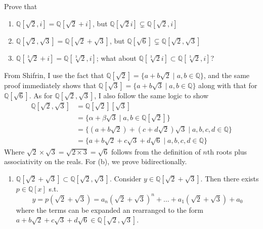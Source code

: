   \begin{exercise}[Shifrin 3.2.2.b/c]
    Prove that
    \begin{enumerate}
      \item $\mathbb{Q}[\sqrt{2}, i] = \mathbb{Q}[\sqrt{2} + i]$, but $\mathbb{Q}[\sqrt{2}i] \subsetneq \mathbb{Q}[\sqrt{2}, i]$
      \item $\mathbb{Q}[\sqrt{2}, \sqrt{3}] = \mathbb{Q}[\sqrt{2} + \sqrt{3}]$, but $\mathbb{Q}[\sqrt{6}] \subsetneq \mathbb{Q}[\sqrt{2}, \sqrt{3}]$
      \item $\mathbb{Q}[\sqrt[3]{2} + i] = \mathbb{Q}[\sqrt[3]{2}, i]$; what about $\mathbb{Q}[\sqrt[3]{2}i] \subset \mathbb{Q}[\sqrt[3]{2}, i]$?
    \end{enumerate}
  \end{exercise}
  \begin{solution}
    From Shifrin, I use the fact that $\mathbb{Q}[\sqrt{2}] = \{ a + b \sqrt{2} \mid a, b \in \mathbb{Q}\}$, and the same proof immediately shows that $\mathbb{Q}[\sqrt{3}] = \{ a + b \sqrt{3} \mid a, b \in \mathbb{Q}\}$ along with that for $\mathbb{Q}[\sqrt{6}]$. As for $\mathbb{Q}[\sqrt{2}, \sqrt{3}]$, I also follow the same logic to show 
    \begin{align}
      \mathbb{Q}[\sqrt{2}, \sqrt{3}] & = \mathbb{Q}[\sqrt{2}][\sqrt{3}] \\
                                     & = \{\alpha + \beta \sqrt{3} \mid a, b \in \mathbb{Q}[\sqrt{2}]\} \\
                                     & = \{ (a + b\sqrt{2}) + (c + d \sqrt{2}) \sqrt{3} \mid a, b, c, d \in \mathbb{Q} \} \\
                                     & = \{ a + b\sqrt{2} + c \sqrt{3} + d \sqrt{6} \mid a, b, c, d \in \mathbb{Q} \} 
    \end{align}
    Where $\sqrt{2} \times \sqrt{3} = \sqrt{2 \times 3} = \sqrt{6}$ follows from the definition of $n$th roots plus associativity on the reals. For (b), we prove bidirectionally.
    \begin{enumerate}
      \item $\mathbb{Q}[ \sqrt{2} + \sqrt{3}] \subset \mathbb{Q}[\sqrt{2}, \sqrt{3}]$. Consider $y \in \mathbb{Q}[\sqrt{2} + \sqrt{3}]$. Then there exists $p \in \mathbb{Q}[x]$ s.t. 
      \begin{equation}
        y = p(\sqrt{2} + \sqrt{3}) = a_n (\sqrt{2} + \sqrt{3})^n + \ldots + a_1 (\sqrt{2} + \sqrt{3}) + a_0
      \end{equation}
      where the terms can be expanded an rearranged to the form $a + b \sqrt{2} + c \sqrt{3} + d \sqrt{6} \in \mathbb{Q}[\sqrt{2}, \sqrt{3}]$. 


\end{enumerate}
\end{solution}
